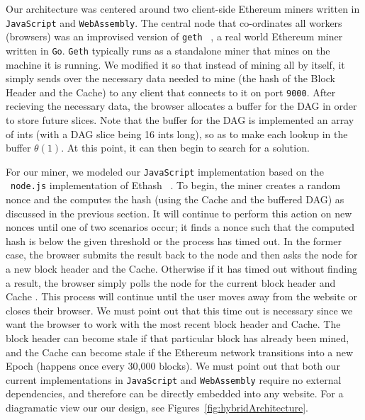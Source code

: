 \documentclass[10pt, conference, compsocconf]{IEEEtran}
\begin{document}

Our architecture was centered around two client-side Ethereum miners written in \verb|JavaScript| and \verb|WebAssembly|. The central node that co-ordinates all workers (browsers) was an improvised version of \verb|geth| ~\cite{geth}, a real world Ethereum miner written in \verb|Go|. \verb|Geth| typically runs as a standalone miner that mines on the machine it is running. We modified it so that instead of mining all by itself, it simply sends over the necessary data needed to mine (the hash of the Block Header and the Cache) to any client that connects to it on port \verb|9000|. After recieving the necessary data, the browser allocates a buffer for the DAG in order to store future slices. Note that the buffer for the DAG is implemented an array of ints (with a DAG slice being 16 ints long), so as to make each lookup in the buffer $\theta(1)$. At this point, it can then begin to search for a solution. 

For our miner, we modeled our \verb|JavaScript| implementation based on the ~\verb|node.js| implementation of Ethash ~\cite{ethash}. To begin, the miner creates a random nonce and the computes the hash (using the Cache and the buffered DAG) as discussed in the previous section. It will continue to perform this action on new nonces until one of two scenarios occur; it finds a nonce such that the computed hash is below the given threshold or the process has timed out. In the former case, the browser submits the result back to the node and then asks the node for a new block header and the Cache. Otherwise if it has timed out without finding a result, the browser simply polls the node for the current block header and Cache . This process will continue until the user moves away from the website or closes their browser. 
We must point out that this time out is necessary since we want the browser to work with the most recent block header and Cache. The block header can become stale if that particular block has already been mined, and the Cache can become stale if the Ethereum network transitions into a new Epoch (happens once every 30,000 blocks). 
We must point out that both our current implementations in \verb|JavaScript| and \verb|WebAssembly| require no external dependencies, and therefore can be directly embedded into any website. For a diagramatic view our our design, see Figures~\ref{fig:hybridArchitecture}.
\end{document}
